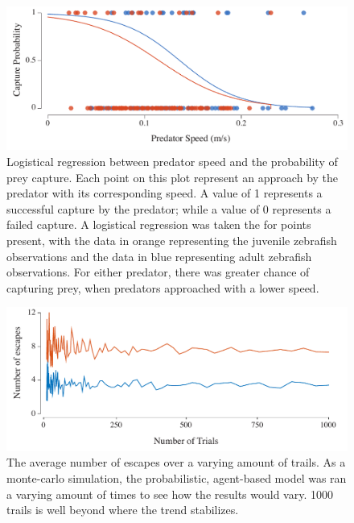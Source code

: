 \documentclass[11pt]{article}
\begin{document}
\begin{figure}[!h]
\centering
	\includegraphics[width=5.5in]{supp_pred_speed_vs_capture}
\caption{Logistical regression between predator speed and the probability of prey capture.
Each point on this plot represent an approach by the predator with its corresponding speed.
A value of 1 represents a successful capture by the predator; while a value of 0 represents a failed capture. 
A logistical regression was taken the for points present, with the data in orange representing the juvenile zebrafish observations and the data in blue representing adult zebrafish observations.
For either predator, there was greater chance of capturing prey, when predators approached with a lower speed.
}
\label{fig_sense}
\end{figure}

\begin{figure}[!h]
\centering
	\includegraphics[width=5.5in]{supp_num_trials}
\caption{The average number of escapes over a varying amount of trails.
As a monte-carlo simulation, the probabilistic, agent-based model was ran a varying amount of times to see how the results would vary.
1000 trails is well beyond where the trend stabilizes.
}
\label{fig_sense}
\end{figure}
\end{document}
